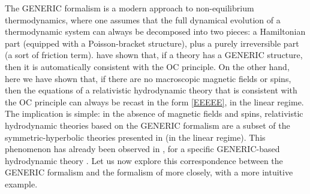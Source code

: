 \documentclass[a4paper, amsfonts, amssymb, amsmath, reprint, showkeys, nofootinbib, twoside, onecolumn,notitlepage]{revtex4-1}
\begin{document}
The GENERIC formalism \cite{Grmela1997,Otting0_1998,
Otting2_1999,Otting3_1999,OttingerReview2018,OttingerReview2018} is a modern approach to non-equilibrium thermodynamics, where one assumes that the full dynamical evolution of a thermodynamic system can always be decomposed into two pieces: a Hamiltonian part (equipped with a Poisson-bracket structure), plus a purely irreversible part  (a sort of friction term). \citet{Pavelka2014} have shown that, if a theory has a GENERIC structure, then it is automatically consistent with the OC principle. On the other hand, here we have shown that, if there are no macroscopic magnetic fields or spins, then the equations of a relativistic hydrodynamic theory that is consistent with the OC principle can always be recast in the form \eqref{EEEEE}, in the linear regime. The implication is simple: in the absence of magnetic fields and spins, relativistic hydrodynamic theories based on the GENERIC formalism are a subset of the symmetric-hyperbolic theories presented in \cite{GavassinoNonHydro2022} (in the linear regime). This phenomenon has already been observed in \cite{GavassinoGENERIC2022}, for a specific GENERIC-based hydrodynamic theory \cite{Stricker2019}. Let us now explore this correspondence between the GENERIC formalism and the formalism of \cite{GavassinoNonHydro2022} more closely, with a more intuitive example.
\end{document}
